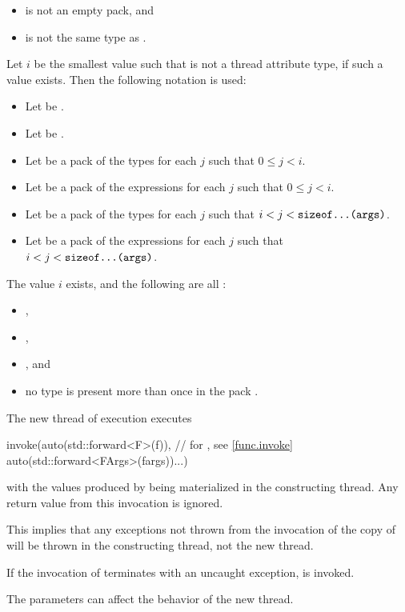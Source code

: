 \begin{itemdescr}
\pnum
\constraints
\begin{itemize}
\item
{} is not an empty pack, and
\item
{} is not the same type as .
\end{itemize}

\pnum
Let $i$ be the smallest value such that
is not a thread attribute type,
if such a value exists.
Then the following notation is used:
\begin{itemize}
\item
Let  be .
\item
Let  be .
\item
Let  be a pack of the types
 for each $j$
such that $0 \leq j < i$.
\item
Let  be a pack of the expressions
 for each $j$
such that $0 \leq j < i$.
\item
Let  be a pack of the types
 for each $j$
such that $i < j < \tcode{sizeof...(args)}$.
\item
Let  be a pack of the expressions
 for each $j$
such that $i < j < \tcode{sizeof...(args)}$.
\end{itemize}

\pnum
\mandates
The value $i$ exists, and the following are all :
\begin{itemize}
\item {},
\item {},
\item {}, and
\item no type is present more than once in the pack .
\end{itemize}

\pnum
\effects
The new thread of execution executes
\begin{codeblock}
invoke(auto(std::forward<F>(f)),                // for , see \ref{func.invoke}
       auto(std::forward<FArgs>(fargs))...)
\end{codeblock}
with the values produced by 
being materialized in the constructing thread.
Any return value from this invocation is ignored.
\begin{note}
This implies that any exceptions not thrown from the invocation of the copy
of  will be thrown in the constructing thread, not the new thread.
\end{note}
If the invocation of  terminates with an uncaught exception,
 is invoked.
\begin{note}
The parameters 
can affect the behavior of the new thread.
\end{note}


\end{itemdescr}
